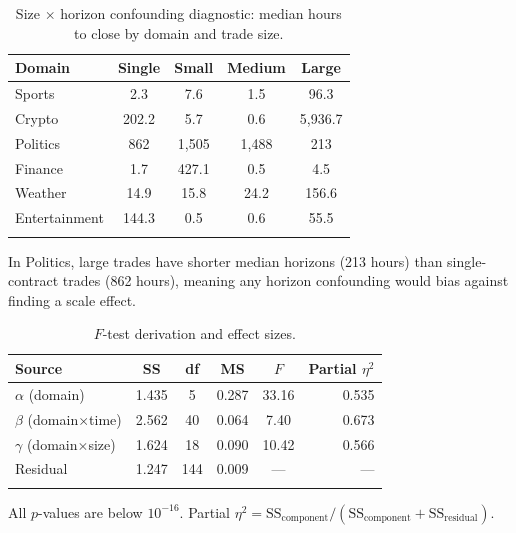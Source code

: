 \documentclass[numsec,webpdf,modern,medium]{oup-authoring-template}
\theoremstyle{thmstyleone}%
\theoremstyle{thmstyletwo}%
\theoremstyle{thmstylethree}%
\begin{document}
\begin{appendices}
\begin{table}[!t]
\caption{Size $\times$ horizon confounding diagnostic: median hours to close by domain and trade size.\label{tab:confound}}%
\begin{tabular*}{\columnwidth}{@{\extracolsep\fill}lcccc@{\extracolsep\fill}}
\toprule
Domain & Single & Small & Medium & Large \\
\midrule
Sports        & 2.3   & 7.6    & 1.5    & 96.3   \\
Crypto        & 202.2 & 5.7    & 0.6    & 5,936.7\\
Politics      & 862   & 1,505  & 1,488  & 213    \\
Finance       & 1.7   & 427.1  & 0.5    & 4.5    \\
Weather       & 14.9  & 15.8   & 24.2   & 156.6  \\
Entertainment & 144.3 & 0.5    & 0.6    & 55.5   \\
\botrule
\end{tabular*}
\begin{tablenotes}%
\item In Politics, large trades have shorter median horizons (213 hours) than single-contract trades (862 hours), meaning any horizon confounding would bias against finding a scale effect.
\end{tablenotes}
\end{table}
\begin{table}[!t]
\caption{$F$-test derivation and effect sizes.\label{tab:ftest}}%
\begin{tabular*}{\columnwidth}{@{\extracolsep\fill}lccccr@{\extracolsep\fill}}
\toprule
Source & SS & df & MS & $F$ & Partial $\eta^2$ \\
\midrule
$\alpha$ (domain)        & 1.435 & 5   & 0.287 & 33.16 & 0.535 \\
$\beta$ (domain$\times$time) & 2.562 & 40  & 0.064 & 7.40  & 0.673 \\
$\gamma$ (domain$\times$size)& 1.624 & 18  & 0.090 & 10.42 & 0.566 \\
Residual                 & 1.247 & 144 & 0.009 & ---   & ---   \\
\botrule
\end{tabular*}
\begin{tablenotes}%
\item All $p$-values are below $10^{-16}$. Partial $\eta^2 = \mathrm{SS}_{\text{component}} / (\mathrm{SS}_{\text{component}} + \mathrm{SS}_{\text{residual}})$.
\end{tablenotes}
\end{table}

\end{appendices}
\end{document}
